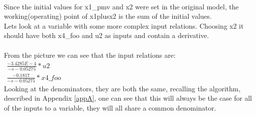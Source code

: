 \setlength\fboxsep{0pt}
\setlength\fboxrule{0.5pt}
\\\newline
Since the initial values for x1\_pmv and x2 were set in the original model, the working(operating) point of x1plusx2 is the sum of the initial values.\\\newline
Lets look at a variable with some more complex input relations. Choosing x2 it should have both x4\_foo and u2 as inputs and contain a derivative.\\\newline
\setlength\fboxsep{0pt}
\setlength\fboxrule{0.5pt}
\\\newline
From the picture we can see that the input relations are:\\
$\begin{array}{rcl} \frac{-3.4285E-4}{-s -0.05275}*u2 \end{array}$\\
$\begin{array}{rcl} \frac{-0.1817}{-s -0.05275}*x4\_foo \end{array}$\\\newline
Looking at the denominators, they are both the same, recalling the algorithm, described in Appendix \ref{appA}, one can see that this will always be the case for all of the inputs to a variable, they will all share a common denominator.